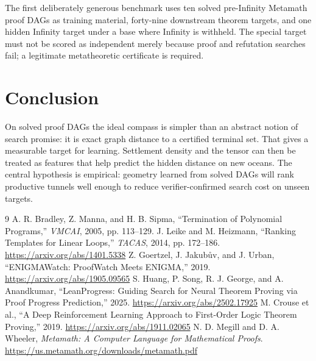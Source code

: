 \documentclass[11pt]{article}
\begin{document}
The first deliberately generous benchmark uses ten solved pre-Infinity Metamath proof DAGs as training material, forty-nine downstream theorem targets, and one hidden Infinity target under a base where Infinity is withheld. The special target must not be scored as independent merely because proof and refutation searches fail; a legitimate metatheoretic certificate is required.

\section{Conclusion}
On solved proof DAGs the ideal compass is simpler than an abstract notion of search promise: it is exact graph distance to a certified terminal set. That gives a measurable target for learning. Settlement density and the tensor can then be treated as features that help predict the hidden distance on new oceans. The central hypothesis is empirical: geometry learned from solved DAGs will rank productive tunnels well enough to reduce verifier-confirmed search cost on unseen targets.

\begin{thebibliography}{9}
 A. R. Bradley, Z. Manna, and H. B. Sipma, ``Termination of Polynomial Programs,'' \emph{VMCAI}, 2005, pp. 113--129.
 J. Leike and M. Heizmann, ``Ranking Templates for Linear Loops,'' \emph{TACAS}, 2014, pp. 172--186. \url{https://arxiv.org/abs/1401.5338}
 Z. Goertzel, J. Jakub\r{u}v, and J. Urban, ``ENIGMAWatch: ProofWatch Meets ENIGMA,'' 2019. \url{https://arxiv.org/abs/1905.09565}
 S. Huang, P. Song, R. J. George, and A. Anandkumar, ``LeanProgress: Guiding Search for Neural Theorem Proving via Proof Progress Prediction,'' 2025. \url{https://arxiv.org/abs/2502.17925}
 M. Crouse et al., ``A Deep Reinforcement Learning Approach to First-Order Logic Theorem Proving,'' 2019. \url{https://arxiv.org/abs/1911.02065}
 N. D. Megill and D. A. Wheeler, \emph{Metamath: A Computer Language for Mathematical Proofs}. \url{https://us.metamath.org/downloads/metamath.pdf}
\end{thebibliography}
\end{document}
